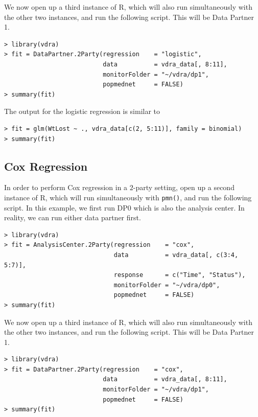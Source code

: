 \documentclass[12]{article}
\begin{document}
We now open up a third instance of R, which will also run simultaneously with the other two instances, and run the following script.  This will be Data Partner 1.

\begin{verbatim}
> library(vdra)
> fit = DataPartner.2Party(regression    = "logistic",
                           data          = vdra_data[, 8:11],
                           monitorFolder = "~/vdra/dp1",
                           popmednet     = FALSE)
> summary(fit)
\end{verbatim}

The output for the logistic regression is similar to 

\begin{verbatim}
> fit = glm(WtLost ~ ., vdra_data[c(2, 5:11)], family = binomial)
> summary(fit)
\end{verbatim}


\subsection{Cox Regression}

In order to perform Cox regression in a $2$-party setting, open up a second instance of R, which will run simultaneously with \verb"pmn()", and run the following script.  In this example, we first run DP0 which is also the analysis center.  In reality, we can run either data partner first.

\begin{verbatim}
> library(vdra)
> fit = AnalysisCenter.2Party(regression    = "cox",
                              data          = vdra_data[, c(3:4, 5:7)],
                              response      = c("Time", "Status"),
                              monitorFolder = "~/vdra/dp0",
                              popmednet     = FALSE)
> summary(fit)
\end{verbatim}

We now open up a third instance of R, which will also run simultaneously with the other two instances, and run the following script.  This will be Data Partner 1.

\begin{verbatim}
> library(vdra)
> fit = DataPartner.2Party(regression    = "cox",
                           data          = vdra_data[, 8:11],
                           monitorFolder = "~/vdra/dp1",
                           popmednet     = FALSE)
> summary(fit)
\end{verbatim}
\end{document}
